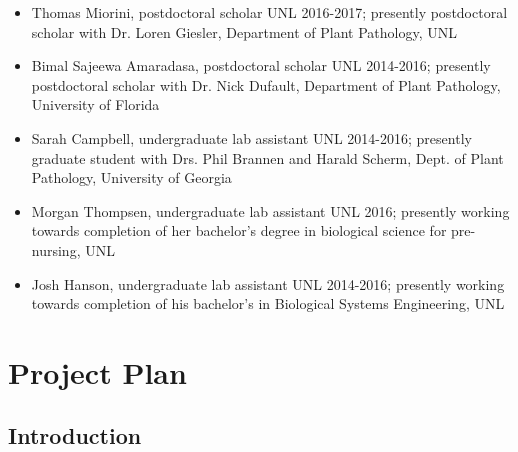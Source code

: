 \documentclass[12pt,letterpaper]{article}
\begin{document}

\begin{itemize}
  \item Thomas Miorini, postdoctoral scholar UNL 2016-2017; presently postdoctoral scholar with Dr. Loren Giesler, Department of Plant Pathology, UNL

  \item Bimal Sajeewa Amaradasa, postdoctoral scholar UNL 2014-2016; presently postdoctoral scholar with Dr. Nick Dufault, Department of Plant Pathology, University of Florida

  \item Sarah Campbell, undergraduate lab assistant UNL 2014-2016; presently graduate student with Drs. Phil Brannen and Harald Scherm, Dept. of Plant Pathology, University of Georgia

  \item Morgan Thompsen, undergraduate lab assistant UNL 2016; presently working towards completion of her bachelor's degree in biological science for pre-nursing, UNL

  \item Josh Hanson, undergraduate lab assistant UNL 2014-2016; presently working towards completion of his bachelor's in Biological Systems Engineering, UNL
\end{itemize}



\section{Project Plan}

\subsection{Introduction}
\end{document}
